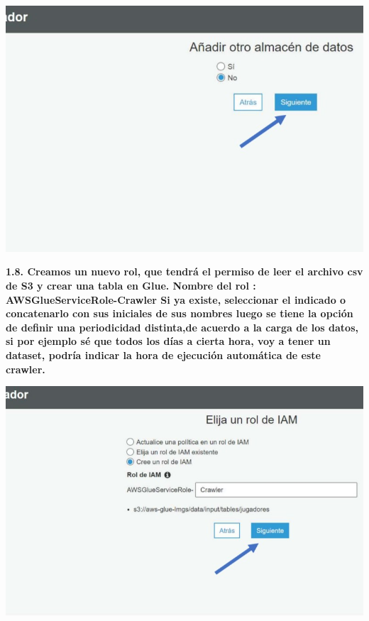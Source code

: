 \documentclass{article}
\begin{document}
    \begin{center}
		\includegraphics[width=15cm]{./images/7} 
	\end{center}
	
	\newpage
\textbf{1.8.  Creamos un nuevo rol, que tendrá el permiso de leer el archivo csv de S3 y crear una tabla en Glue.
Nombre del rol : AWSGlueServiceRole-Crawler Si ya existe, seleccionar el indicado o concatenarlo con
sus iniciales de sus nombres luego se tiene la opción de definir una periodicidad distinta,de acuerdo a la carga de los datos, si por ejemplo
sé que todos los días a cierta hora, voy a tener un dataset, podría indicar la hora de ejecución automática
de este crawler.
}

    \begin{center}
		\includegraphics[width=15cm]{./images/8} 
	\end{center}
	
\end{document}
